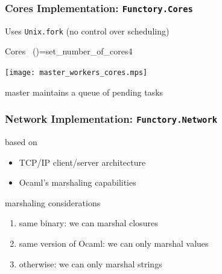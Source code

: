 \documentclass[xcolor=dvipsnames,8pt]{beamer}
\let\emph\alert
\begin{document}

\begin{frame}\frametitle {Cores Implementation: \texttt{Functory.Cores}}
  Uses \texttt{Unix.fork} (no control over scheduling)

  

\medskip\noindent
{\colorbox{tmpcolor}{\begin{minipage}{\textwidth}\tt\parindent 0pt

\noindent{}\hspace*{1.22ex}Cores~\linebreak
\noindent{}\hspace*{1.22ex}()\hspace*{1.22ex}=\hspace*{1.22ex}set\_{}number\_{}of\_{}cores\hspace*{1.22ex}4
\end{minipage}}}


\medskip\noindent

  \begin{center}
    \texttt{[image: master\_workers\_cores.mps]}
  \end{center}

  master maintains a queue of pending tasks
  
\end{frame}



\begin{frame}\frametitle {Network Implementation: \texttt{Functory.Network}}
  based on
  \begin{itemize}
  \item TCP/IP client/server architecture
  \item Ocaml's marshaling capabilities
  \end{itemize}
  
  \vfill
  marshaling considerations
  \begin{enumerate}
  \item \emph{same binary}: we can marshal closures
  \item \emph{same version of Ocaml}: we can only marshal values
  \item \emph{otherwise}: we can only marshal strings
  \end{enumerate}
  
\end{frame}
\end{document}
